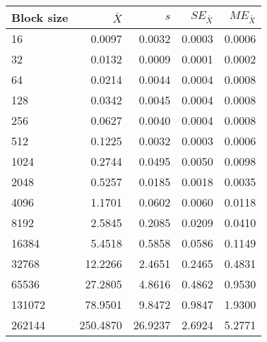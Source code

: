 \begin{tabular}{lrrrr}\toprule
{\small Block size} & $\bar{X}$ & $s$ & $SE_{\bar{X}}$ & $ME_{\bar{X}}$ \\\midrule
16 & 0.0097 & 0.0032 & 0.0003 & 0.0006\\
32 & 0.0132 & 0.0009 & 0.0001 & 0.0002\\
64 & 0.0214 & 0.0044 & 0.0004 & 0.0008\\
128 & 0.0342 & 0.0045 & 0.0004 & 0.0008\\
256 & 0.0627 & 0.0040 & 0.0004 & 0.0008\\
512 & 0.1225 & 0.0032 & 0.0003 & 0.0006\\
1024 & 0.2744 & 0.0495 & 0.0050 & 0.0098\\
2048 & 0.5257 & 0.0185 & 0.0018 & 0.0035\\
4096 & 1.1701 & 0.0602 & 0.0060 & 0.0118\\
8192 & 2.5845 & 0.2085 & 0.0209 & 0.0410\\
16384 & 5.4518 & 0.5858 & 0.0586 & 0.1149\\
32768 & 12.2266 & 2.4651 & 0.2465 & 0.4831\\
65536 & 27.2805 & 4.8616 & 0.4862 & 0.9530\\
131072 & 78.9501 & 9.8472 & 0.9847 & 1.9300\\
262144 & 250.4870 & 26.9237 & 2.6924 & 5.2771\\
\bottomrule
\end{tabular}

